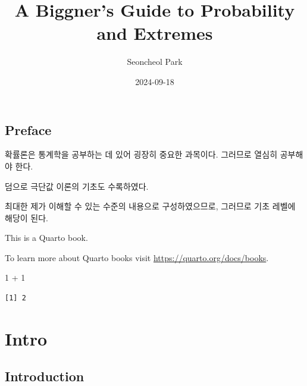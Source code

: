 \documentclass[
  13pt,
  letterpaper,
  DIV=11,
  numbers=noendperiod]{scrreprt}
\title{A Biggner's Guide to Probability and Extremes}
\author{Seoncheol Park}
\date{2024-09-18}
\newenvironment{Shaded}{\begin{snugshade}}{\end{snugshade}}
\newcommand{\DecValTok}[1]{\textcolor[rgb]{0.68,0.00,0.00}{#1}}
\newcommand{\SpecialCharTok}[1]{\textcolor[rgb]{0.37,0.37,0.37}{#1}}
\renewcommand*\contentsname{Table of contents}
\newcommand\contentsname{Table of contents}
\theoremstyle{definition}
\theoremstyle{plain}
\theoremstyle{definition}
\theoremstyle{plain}
\theoremstyle{plain}
\theoremstyle{definition}
\theoremstyle{remark}
\begin{document}
\maketitle

\renewcommand{\Return}{\State \textbf{return}~}
\newcommand{\Print}{\State \textbf{print}~}
\newcommand{\Break}{\State \textbf{break}}
\newcommand{\Continue}{\State \textbf{continue}}
\newcommand{\True}{\textbf{true}}
\newcommand{\False}{\textbf{false}}
\renewcommand{\And}{\textbf{and}~}
\newcommand{\Or}{\textbf{or}~}
\renewcommand{\Not}{\textbf{not}~}
\newcommand{\To}{\textbf{to}~}
\newcommand{\DownTo}{\textbf{downto}~}


\renewcommand*\contentsname{Table of contents}
{
\hypersetup{linkcolor=}
\setcounter{tocdepth}{2}
\tableofcontents
}

\chapter*{Preface}\label{preface}


확률론은 통계학을 공부하는 데 있어 굉장히 중요한 과목이다. 그러므로
열심히 공부해야 한다.

덤으로 극단값 이론의 기초도 수록하였다.

최대한 제가 이해할 수 있는 수준의 내용으로 구성하였으므로, 그러므로 기초
레벨에 해당이 된다.

This is a Quarto book.

To learn more about Quarto books visit
\url{https://quarto.org/docs/books}.

\begin{Shaded}
\begin{Highlighting}[]
\DecValTok{1} \SpecialCharTok{+} \DecValTok{1}
\end{Highlighting}
\end{Shaded}

\begin{verbatim}
[1] 2
\end{verbatim}

\part{Intro}

\chapter{Introduction}\label{introduction}
\end{document}
